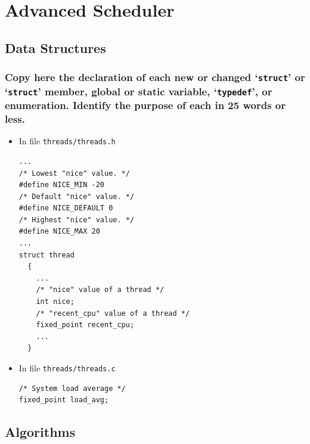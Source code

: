 \documentclass[sigconf, nonacm, balance=false, urlbreakonhyphens=true]{acmart}
\begin{document}
    \section{Advanced Scheduler}

        \label{Advanced Scheduler}

        \subsection{Data Structures}
            
            \subsubsection{Copy here the declaration of each new or changed `\texttt{struct}' or `\texttt{struct}' member, global or static variable, `\texttt{typedef}', or enumeration. Identify the purpose of each in 25 words or less. } 

                \begin{itemize}
                    \item In file \texttt{threads/threads.h}
\begin{verbatim}
...
/* Lowest "nice" value. */
#define NICE_MIN -20
/* Default "nice" value. */
#define NICE_DEFAULT 0
/* Highest "nice" value. */
#define NICE_MAX 20
...
struct thread
  {
    ...
    /* "nice" value of a thread */
    int nice;
    /* "recent_cpu" value of a thread */
    fixed_point recent_cpu;
    ...
  }\end{verbatim}
                    \item In file \texttt{threads/threads.c}
\begin{verbatim}
/* System load average */
fixed_point load_avg;\end{verbatim}
                \end{itemize}

        \subsection{Algorithms}
\end{document}
